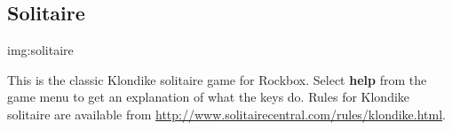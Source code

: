\subsection{Solitaire}
%
{img:solitaire}

This is the classic Klondike solitaire game
for Rockbox.  Select \textbf{help }from the game menu to get an
explanation of what the keys do.  Rules for Klondike solitaire are
available from \url{http://www.solitairecentral.com/rules/klondike.html}.


